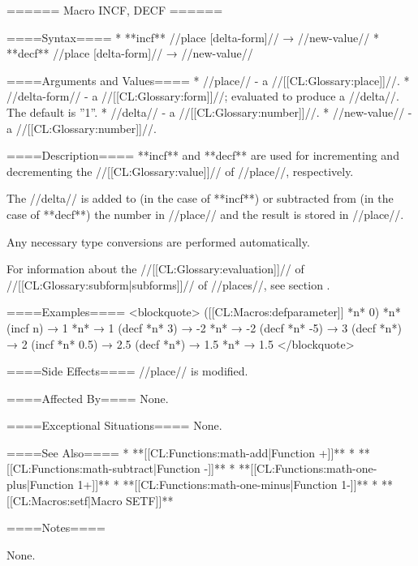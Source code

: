 ====== Macro INCF, DECF ======

====Syntax====
  * **incf** //place [delta-form]// → //new-value// 
  * **decf** //place [delta-form]// → //new-value//

====Arguments and Values====
  * //place// - a //[[CL:Glossary:place]]//.
  * //delta-form// - a //[[CL:Glossary:form]]//; evaluated to produce a //delta//. The default is ''1''.
  * //delta// - a //[[CL:Glossary:number]]//.
  * //new-value// - a //[[CL:Glossary:number]]//.

====Description====
**incf** and **decf** are used for incrementing and decrementing the //[[CL:Glossary:value]]// of //place//, respectively.

The //delta// is added to (in the case of **incf**) or subtracted from (in the case of **decf**) the number in //place// and the result is stored in //place//.

Any necessary type conversions are performed automatically.

For information about the //[[CL:Glossary:evaluation]]// of //[[CL:Glossary:subform|subforms]]// of //places//, see section {\secref\GenRefSubFormEval}.

====Examples====
<blockquote>
([[CL:Macros:defparameter]] *n* 0) *n*
(incf n) → 1 
*n* → 1 
(decf *n* 3) → -2 
*n* → -2 
(decf *n* -5) → 3 
(decf *n*) → 2 
(incf *n* 0.5) → 2.5 
(decf *n*) → 1.5 
*n* → 1.5 
</blockquote>

====Side Effects====
//place// is modified.

====Affected By====
None.

====Exceptional Situations====
None.

====See Also====
  * **[[CL:Functions:math-add|Function +]]**
  * **[[CL:Functions:math-subtract|Function -]]**
  * **[[CL:Functions:math-one-plus|Function 1+]]**
  * **[[CL:Functions:math-one-minus|Function 1-]]**
  * **[[CL:Macros:setf|Macro SETF]]**

====Notes====

None.



